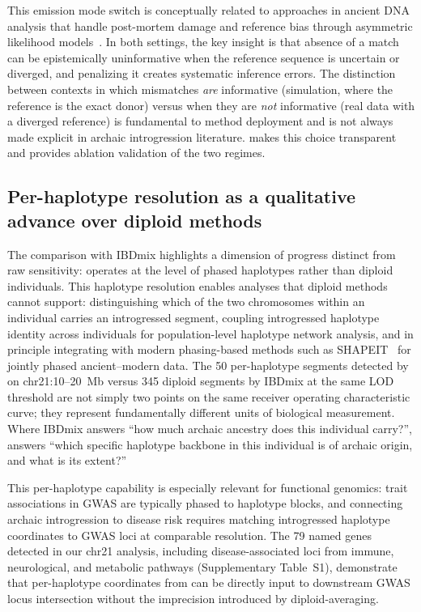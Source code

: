 This emission mode switch is conceptually related to approaches in ancient DNA
analysis that handle post-mortem damage and reference bias through asymmetric
likelihood models~\citep{jonsson2013mapdamage}.
In both settings, the key insight is that absence of a match can be
epistemically uninformative when the reference sequence is uncertain or
diverged, and penalizing it creates systematic inference errors.
The distinction between contexts in which mismatches \emph{are} informative (simulation,
where the reference is the exact donor) versus when they are \emph{not} informative
(real data with a diverged reference) is fundamental to method deployment and
is not always made explicit in archaic introgression literature.
\AP{} makes this choice transparent and provides ablation validation of the
two regimes.

\subsection*{Per-haplotype resolution as a qualitative advance over diploid methods}

The comparison with IBDmix highlights a dimension of progress distinct from
raw sensitivity: \AP{} operates at the level of phased haplotypes rather than
diploid individuals.
This haplotype resolution enables analyses that diploid methods cannot support:
distinguishing which of the two chromosomes within an individual carries an
introgressed segment, coupling introgressed haplotype identity across individuals
for population-level haplotype network analysis, and in principle integrating
with modern phasing-based methods such as SHAPEIT~\citep{delaneau2019accurate}
for jointly phased ancient--modern data.
The 50 per-haplotype segments detected by \AP{} on chr21:10--20~Mb versus
345 diploid segments by IBDmix at the same LOD threshold are not simply two
points on the same receiver operating characteristic curve; they represent
fundamentally different units of biological measurement.
Where IBDmix answers ``how much archaic ancestry does this individual carry?'',
\AP{} answers ``which specific haplotype backbone in this individual is of
archaic origin, and what is its extent?''

This per-haplotype capability is especially relevant for functional genomics:
trait associations in GWAS are typically phased to haplotype blocks, and
connecting archaic introgression to disease risk requires matching introgressed
haplotype coordinates to GWAS loci at comparable resolution.
The 79 named genes detected in our chr21 analysis, including disease-associated
loci from immune, neurological, and metabolic pathways (Supplementary Table~S1),
demonstrate that per-haplotype coordinates from \AP{} can be directly input
to downstream GWAS locus intersection without the imprecision introduced by
diploid-averaging.

